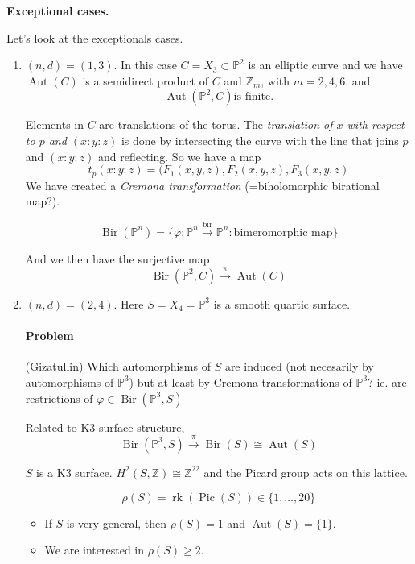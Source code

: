 \medskip\noindent
\textbf{Exceptional cases.}

Let's look at the exceptionals cases.

\begin{enumerate}
	\item $(n,d)=(1,3)$. In this case
	$C=X_3\subset \mathbb{P}^2$ is an elliptic
	curve and we have
		$\operatorname{Aut}(C)$ is a
		semidirect product of $C$ and
		$\mathbb{Z}_m$, with $m=2,4,6$.
and
 $$\operatorname{Aut}(\mathbb{P}^2,C)\text{
 is finite.} $$

 Elements in $C$ are translations of the
 torus. The {\it translation of
 $x$ with respect to $p$ and $(x:y:z)$} is
 done by intersecting the curve with the line
 that joins $p$ and $(x:y:z)$ and reflecting.
 So we have a map
  $$
  t_p(x:y:z)=
  (F_1(x,y,z),F_2(x,y,z),F_3(x,y,z)
  $$
  We have created a {\it Cremona
  transformation} (=biholomorphic birational
  map?).
 
  \begin{definition}
	$$\operatorname{Bir}(\mathbb{P}^n)=\{\varphi
	:\mathbb{P}^n
	\overset{\operatorname{bir}}
	{\longrightarrow}
	\mathbb{P}^n:\text{bimeromorphic
	map} \}$$
\end{definition}

And we then have the surjective map
$$
\operatorname{Bir}(\mathbb{P}^2,C)
\overset{\pi}{\longrightarrow}
\operatorname{Aut}(C)
$$


	\item $(n,d)=(2,4)$. Here
	$S=X_4=\mathbb{P}^3$ is a smooth quartic
	surface.

		\paragraph{Problem} (Gizatullin) Which
		automorphisms of $S$ are induced (not
		necesarily by automorphisms of
		$\mathbb{P}^3$) but at least by Cremona
		transformations of $\mathbb{P}^3$? ie. are
		restrictions of
		$\varphi\in
		\operatorname{Bir}(\mathbb{P}^3,S)$

\begin{remark}
	Related to K3 surface structure,
	$$
	\operatorname{Bir}(\mathbb{P}^3,S)
	\overset{\pi}{\longrightarrow}
	\operatorname{Bir}(S)\cong
	\operatorname{Aut}(S)$$
\end{remark}

$S$ is a K3 surface.
$H^{2}(S,\mathbb{Z})\cong \mathbb{Z}^{22}$
and the Picard group acts on this lattice.

\begin{definition}
	$$
	\rho(S)=
	\operatorname{rk}(\operatorname{Pic}(S))
	\in\{1,\ldots,20\}
	$$
\end{definition}

\begin{itemize}
\item If $S$ is very general, then
$\rho(S)=1$ and
$\operatorname{Aut}(S)=\{1\}$.

\item We are interested in $\rho(S)\geq 2$.
\end{itemize}
\end{enumerate}

